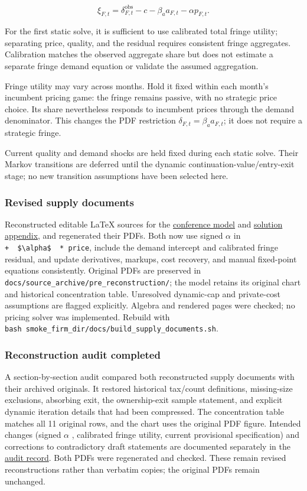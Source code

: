 \documentclass[10pt,]{article}
\begin{document}
\[
\xi_{F,t}=\delta_{F,t}^{\mathrm{obs}}-c-\beta_a a_{F,t}-\alpha  p_{F,t}.
\]

For the first static solve, it is sufficient to use calibrated total
fringe utility; separating price, quality, and the residual requires
consistent fringe aggregates. Calibration matches the observed aggregate
share but does not estimate a separate fringe demand equation or
validate the assumed aggregation.

Fringe utility may vary across months. Hold it fixed within each month's
incumbent pricing game: the fringe remains passive, with no strategic
price choice. Its share nevertheless responds to incumbent prices
through the demand denominator. This changes the PDF restriction
\(\delta_{F,t}=\beta_a a_{F,t}\); it does not require a strategic
fringe.

Current quality and demand shocks are held fixed during each static
solve. Their Markov transitions are deferred until the dynamic
continuation-value/entry-exit stage; no new transition assumptions have
been selected here.

\subsubsection{Revised supply documents}\label{revised-supply-documents}

Reconstructed editable LaTeX sources for the
\href{../ec_supply_conference_model.tex}{conference model} and
\href{../ec_supply_solution_appendix.tex}{solution appendix}, and
regenerated their PDFs. Both now use signed \(\alpha\) in
\texttt{+\ \ \$\textbackslash{}alpha\$\ \ *\ price}, include the demand
intercept and calibrated fringe residual, and update derivatives,
markups, cost recovery, and manual fixed-point equations consistently.
Original PDFs are preserved in
\texttt{docs/source\_archive/pre\_reconstruction/}; the model retains
its original chart and historical concentration table. Unresolved
dynamic-cap and private-cost assumptions are flagged explicitly. Algebra
and rendered pages were checked; no pricing solver was implemented.
Rebuild with
\texttt{bash\ smoke\_firm\_dir/docs/build\_supply\_documents.sh}.

\subsubsection{Reconstruction audit
completed}\label{reconstruction-audit-completed}

A section-by-section audit compared both reconstructed supply documents
with their archived originals. It restored historical tax/count
definitions, missing-size exclusions, absorbing exit, the ownership-exit
sample statement, and explicit dynamic iteration details that had been
compressed. The concentration table matches all 11 original rows, and
the chart uses the original PDF figure. Intended changes (signed
\(\alpha\) , calibrated fringe utility, current provisional
specification) and corrections to contradictory draft statements are
documented separately in the
\href{../audits/supply_pdf_reconstruction_audit_2026-10-27.md}{audit
record}. Both PDFs were regenerated and checked. These remain revised
reconstructions rather than verbatim copies; the original PDFs remain
unchanged.
\end{document}
